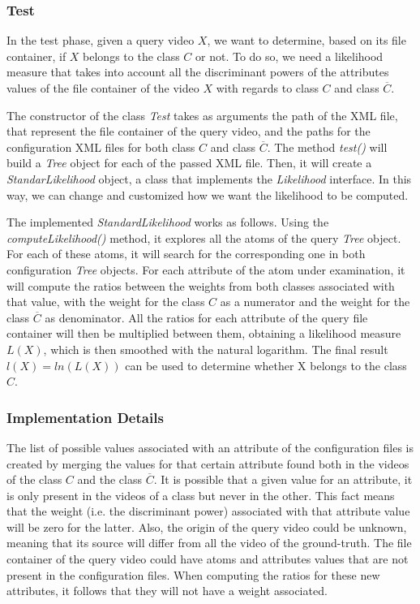 \subsubsection*{Test}

In the test phase, given a query video $X$, we want to determine, based on its file container, if $X$ belongs to the class $C$ or not. To do so, we need a likelihood measure that takes into account all the discriminant powers of the attributes values of the file container of the video $X$ with regards to class $C$ and class $\overline{C}$.

The constructor of the class \emph{Test} takes as arguments the path of the XML file, that represent the file container of the query video, and the paths for the configuration XML files for both class $C$ and class $\overline{C}$.
The method \emph{test()} will build a \emph{Tree} object for each of the passed XML file. Then, it will create a \emph{StandarLikelihood} object, a class that implements the \emph{Likelihood} interface. In this way, we can change and customized how we want the likelihood to be computed.

The implemented \emph{StandardLikelihood} works as follows. Using the \emph{computeLikelihood()} method, it explores all the atoms of the query \emph{Tree} object. For each of these atoms, it will search for the corresponding one in both configuration \emph{Tree} objects. For each attribute of the atom under examination, it will compute the ratios between the weights from both classes associated with that value, with the weight for the class $C$ as a numerator and the weight for the class $\overline{C}$ as denominator. All the ratios for each attribute of the query file container will then be multiplied between them, obtaining a likelihood measure $L(X)$, which is then smoothed with the natural logarithm. 
The final result $l(X) = ln(L(X))$ can be used to determine whether X belongs to the class $C$.


\subsubsection*{Implementation Details}

The list of possible values associated with an attribute of the configuration files is created by merging the values for that certain attribute found both in the videos of the class $C$ and the class $\overline{C}$. It is possible that a given value for an attribute, it is only present in the videos of a class but never in the other. This fact means that the weight (i.e. the discriminant power) associated with that attribute value will be zero for the latter.
Also, the origin of the query video could be unknown, meaning that its source will differ from all the video of the ground-truth. The file container of the query video could have atoms and attributes values that are not present in the configuration files. When computing the ratios for these new attributes, it follows that they will not have a weight associated.

